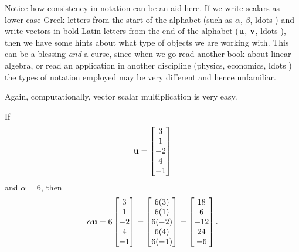 \documentclass{ximera}
\begin{document}
Notice how consistency in notation can be an aid here.  If we write
scalars as lower case Greek letters from the start of the alphabet
(such as $\alpha$, $\beta$, ldots ) and write vectors in bold Latin
letters from the end of the alphabet ($\mathbf{u}$, $\mathbf{v}$, ldots ),
then we have some hints about what type of objects we are working
with.  This can be a blessing \textit{and} a curse, since when we go
read another book about linear algebra, or read an application in
another discipline (physics, economics, ldots ) the types of notation
employed may be very different and hence unfamiliar.

Again, computationally, vector scalar multiplication is very easy.

\begin{example}
  If
  \[
    \mathbf{u}=\begin{bmatrix}3\\1\\-2\\4\\-1\end{bmatrix}
  \]
  and $\alpha=6$, then
  \[
    \alpha\mathbf{u}=
    6\begin{bmatrix}3\\1\\-2\\4\\-1\end{bmatrix}=
    \begin{bmatrix}6(3)\\6(1)\\6(-2)\\6(4)\\6(-1)\end{bmatrix}=
    \begin{bmatrix}18\\6\\-12\\24\\-6\end{bmatrix}.
  \]
\end{example}
\end{document}
